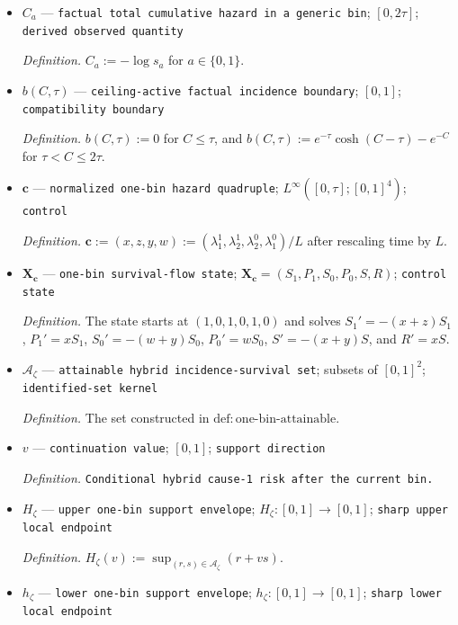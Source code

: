 \documentclass{article}
\begin{document}
\begin{itemize}
  \par\smallskip\noindent\emph{Definition.} \(\zeta:=((p_1,q_1,s_1),(p_0,q_0,s_0))\).
  \item \(C_a\) --- \texttt{factual total cumulative hazard in a generic bin}; \([0,2\tau]\); \texttt{derived observed quantity}
  \par\smallskip\noindent\emph{Definition.} \(C_a:=-\log s_a\) for \(a\in\{0,1\}\).
  \item \(b(C,\tau)\) --- \texttt{ceiling-\allowbreak{}active factual incidence boundary}; \([0,1]\); \texttt{compatibility boundary}
  \par\smallskip\noindent\emph{Definition.} \(b(C,\tau):=0\) for \(C\le\tau\), and \(b(C,\tau):=e^{-\tau}\cosh(C-\tau)-e^{-C}\) for \(\tau<C\le2\tau\).
  \item \(\mathbf c\) --- \texttt{normalized one-\allowbreak{}bin hazard quadruple}; \(L^{\infty}([0,\tau];[0,1]^4)\); \texttt{control}
  \par\smallskip\noindent\emph{Definition.} \(\mathbf c:=(x,z,y,w):=(\lambda_1^1,\lambda_2^1,\lambda_2^0,\lambda_1^0)/L\) after rescaling time by \(L\).
  \item \(\mathbf X_{\mathbf c}\) --- \texttt{one-\allowbreak{}bin survival-\allowbreak{}flow state}; \(\mathbf X_{\mathbf c}=(S_1,P_1,S_0,P_0,S,R)\); \texttt{control state}
  \par\smallskip\noindent\emph{Definition.} The state starts at \((1,0,1,0,1,0)\) and solves \(S_1'=-(x+z)S_1\), \(P_1'=xS_1\), \(S_0'=-(w+y)S_0\), \(P_0'=wS_0\), \(S'=-(x+y)S\), and \(R'=xS\).
  \item \(\mathcal A_{\zeta}\) --- \texttt{attainable hybrid incidence-\allowbreak{}survival set}; subsets of \([0,1]^2\); \texttt{identified-\allowbreak{}set kernel}
  \par\smallskip\noindent\emph{Definition.} The set constructed in \(\mathrm{def{:}one\text{-}bin\text{-}attainable}\).
  \item \(v\) --- \texttt{continuation value}; \([0,1]\); \texttt{support direction}
  \par\smallskip\noindent\emph{Definition.} \texttt{Conditional hybrid cause-\allowbreak{}1 risk after the current bin.}
  \item \(H_{\zeta}\) --- \texttt{upper one-\allowbreak{}bin support envelope}; \(H_{\zeta}:[0,1]\to[0,1]\); \texttt{sharp upper local endpoint}
  \par\smallskip\noindent\emph{Definition.} \(H_{\zeta}(v):=\sup_{(r,s)\in\mathcal A_{\zeta}}(r+vs)\).
  \item \(h_{\zeta}\) --- \texttt{lower one-\allowbreak{}bin support envelope}; \(h_{\zeta}:[0,1]\to[0,1]\); \texttt{sharp lower local endpoint}

\end{itemize}
\end{document}
